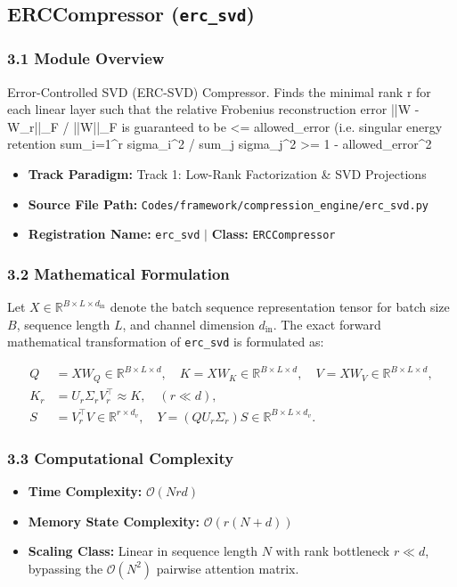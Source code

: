 \subsection{ERCCompressor (\texttt{erc\_svd})}
\label{sec:app_module_erc_svd}

\subsubsection*{3.1 Module Overview}
Error-Controlled SVD (ERC-SVD) Compressor.  Finds the minimal rank r for each linear layer such that the relative Frobenius reconstruction error ||W - W\_r||\_F / ||W||\_F is guaranteed to be <= allowed\_error (i.e. singular energy retention sum\_{i=1}^r sigma\_i^2 / sum\_j sigma\_j^2 >= 1 - allowed\_error^2
\begin{itemize}
    \item \textbf{Track Paradigm:} Track 1: Low-Rank Factorization & SVD Projections
    \item \textbf{Source File Path:} \texttt{Codes/framework/compression\_engine/erc\_svd.py}
    \item \textbf{Registration Name:} \texttt{erc\_svd} $\mid$ \textbf{Class:} \texttt{ERCCompressor}
\end{itemize}

\subsubsection*{3.2 Mathematical Formulation}
Let $X \in \mathbb{R}^{B \times L \times d_{\text{in}}}$ denote the batch sequence representation tensor for batch size $B$, sequence length $L$, and channel dimension $d_{\text{in}}$. The exact forward mathematical transformation of \texttt{erc\_svd} is formulated as:

\begin{align}
Q &= X W_Q \in \mathbb{R}^{B \times L \times d}, \quad K = X W_K \in \mathbb{R}^{B \times L \times d}, \quad V = X W_V \in \mathbb{R}^{B \times L \times d}, \\
K_r &= U_r \Sigma_r V_r^\top \approx K, \quad (r \ll d), \\
S &= V_r^\top V \in \mathbb{R}^{r \times d_v}, \quad Y = (Q U_r \Sigma_r) S \in \mathbb{R}^{B \times L \times d_v}.
\end{align}


\subsubsection*{3.3 Computational Complexity}
\begin{itemize}
    \item \textbf{Time Complexity:} $\mathcal{O}(N r d)$
    \item \textbf{Memory State Complexity:} $\mathcal{O}(r(N + d))$
    \item \textbf{Scaling Class:} Linear in sequence length $N$ with rank bottleneck $r \ll d$, bypassing the $\mathcal{O}(N^2)$ pairwise attention matrix.
\end{itemize}

